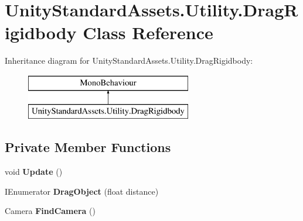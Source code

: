 \hypertarget{class_unity_standard_assets_1_1_utility_1_1_drag_rigidbody}{}\section{Unity\+Standard\+Assets.\+Utility.\+Drag\+Rigidbody Class Reference}
\label{class_unity_standard_assets_1_1_utility_1_1_drag_rigidbody}
Inheritance diagram for Unity\+Standard\+Assets.\+Utility.\+Drag\+Rigidbody\+:\begin{figure}[H]
\begin{center}
\leavevmode
\includegraphics[height=2.000000cm]{class_unity_standard_assets_1_1_utility_1_1_drag_rigidbody}
\end{center}
\end{figure}
\subsection*{Private Member Functions}
\begin{DoxyCompactItemize}
\item 
\mbox{\label{class_unity_standard_assets_1_1_utility_1_1_drag_rigidbody_a60a954748ec9833da60e1e818001476a}} 
void {\bfseries Update} ()
\item 
\mbox{\label{class_unity_standard_assets_1_1_utility_1_1_drag_rigidbody_afcf8fcc39fc12326e601ef17b4fc680e}} 
I\+Enumerator {\bfseries Drag\+Object} (float distance)
\item 
\mbox{\label{class_unity_standard_assets_1_1_utility_1_1_drag_rigidbody_a2b1e596736580deaa056d4c867d93018}} 
Camera {\bfseries Find\+Camera} ()
\end{DoxyCompactItemize}
